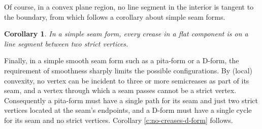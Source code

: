 \documentclass{article}
\newtheorem{lemma}[theorem]{Lemma}
\newtheorem{corollary}[theorem]{Corollary}
\newcommand\comment[1]{}
\begin{document}
\comment{
\begin{lemma}\label{l:no-pc-one-crease}
  If a point  on the surface of a convex body is not a vertex, then either
  \begin{enumerate}
  \item no creases pass through , nor approach with nonzero
    limiting dihedral angle at ; or
  \item all creases with nonzero limiting dihedral angle at  are
    tangent to a common line\end{enumerate}
\end{lemma}
\begin{proof}
  The image  of the Gauss map must be a convex set of zero area,
  because  is not a vertex.  The only such figures on the sphere are
  the singleton points and the great circular arcs.

  If  is a singleton point, then  has only a single
  normal and tangent plane; so no crease can have nonzero dihedral
  angle at , as it would bring two distinct normals and a
  great circular arc between them.

  If  is a great circular arc, then it corresponds to a dihedral
  angle about the line perpendicular to this arc; any nonzero crease
  at  not tangent to this line would introduce an arc of normals
  outside of , so no such crease can be present.
\end{proof}
}

Of course, in a convex plane region, no line segment in the interior is
tangent to the boundary, from which follows a corollary about simple
seam forms.

\begin{corollary}\label{c:no-creases-doubly-convex}
  In a simple seam form, every crease in a flat component
  is on a line segment between two strict vertices.
\end{corollary}

Finally, in a simple smooth seam form such as a pita-form or a D-form,
the requirement of smoothness sharply limits the possible
configurations.  By (local) convexity, no vertex can be incident to three or
more semicreases as part of its seam, and a vertex through which a seam
passes cannot be a strict vertex.  Consequently a pita-form must have
a single path for its seam and just two strict vertices located at the
seam's endpoints, and a D-form must have a single cycle for its seam
and no strict vertices.  Corollary \ref{c:no-creases-d-form} follows.
\end{document}
